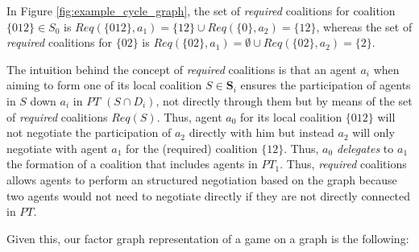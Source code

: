 \documentclass{aamas2012}
\begin{document}
In Figure \ref{fig:example_cycle_graph}, the set of \emph{required}
coalitions for coalition $\{012\}\in S_0$ is $Req(\{012\},a_1) = \{12\} \cup
Req(\{0\},a_2) = \{12\}$, whereas the set of \emph{required} coalitions for $\{02\}$ is
$Req(\{02\},a_1) = \emptyset \cup Req(\{02\},a_2) =\{2\}$.

 
The intuition behind the concept of
\emph{required} coalitions is that an agent $a_i$ when aiming to form one of its local
coalition $S\in \mathbf{S}_i$ ensures the participation of
agents in $S$ down $a_i$ in $PT$ $(S\cap D_i)$, not directly through them
but by means of the set of \emph{required} coalitions $Req(S)$. Thus, agent
$a_0$ for its local coalition $\{012\}$ will not negotiate the participation of $a_2$
directly with him but instead $a_2$ will only negotiate with agent $a_1$ for
the (required) coalition $\{12\}$. Thus, $a_0$ \emph{delegates} to $a_1$ the
formation of a coalition that includes agents in $PT_1$. Thus, \emph{required}
coalitions allows agents to perform an structured negotiation based on the
graph because two agents would not need to negotiate directly if
they are not directly connected in $PT$.


Given this, our factor graph representation of a game on a graph is the
following:


\end{document}
